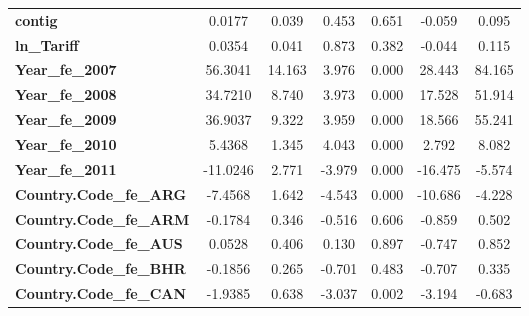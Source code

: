 \begin{center}
\begin{tabular}{lcccccc}
\textbf{contig}                                                    &       0.0177  &        0.039     &     0.453  &         0.651        &       -0.059    &        0.095     \\
\textbf{ln\_Tariff}                                                &       0.0354  &        0.041     &     0.873  &         0.382        &       -0.044    &        0.115     \\
\textbf{Year\_fe\_2007}                                            &      56.3041  &       14.163     &     3.976  &         0.000        &       28.443    &       84.165     \\
\textbf{Year\_fe\_2008}                                            &      34.7210  &        8.740     &     3.973  &         0.000        &       17.528    &       51.914     \\
\textbf{Year\_fe\_2009}                                            &      36.9037  &        9.322     &     3.959  &         0.000        &       18.566    &       55.241     \\
\textbf{Year\_fe\_2010}                                            &       5.4368  &        1.345     &     4.043  &         0.000        &        2.792    &        8.082     \\
\textbf{Year\_fe\_2011}                                            &     -11.0246  &        2.771     &    -3.979  &         0.000        &      -16.475    &       -5.574     \\
\textbf{Country.Code\_fe\_ARG}                                     &      -7.4568  &        1.642     &    -4.543  &         0.000        &      -10.686    &       -4.228     \\
\textbf{Country.Code\_fe\_ARM}                                     &      -0.1784  &        0.346     &    -0.516  &         0.606        &       -0.859    &        0.502     \\
\textbf{Country.Code\_fe\_AUS}                                     &       0.0528  &        0.406     &     0.130  &         0.897        &       -0.747    &        0.852     \\
\textbf{Country.Code\_fe\_BHR}                                     &      -0.1856  &        0.265     &    -0.701  &         0.483        &       -0.707    &        0.335     \\
\textbf{Country.Code\_fe\_CAN}                                     &      -1.9385  &        0.638     &    -3.037  &         0.002        &       -3.194    &       -0.683     \\

\end{tabular}
\end{center}
